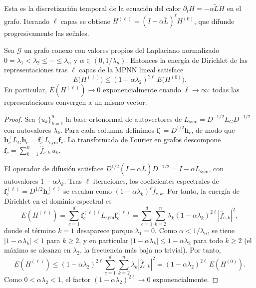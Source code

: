 Esta es la discretizaci\'on temporal de la ecuaci\'on del calor
$\partial_t H = -\alpha \tilde L H$ en el grafo. Iterando $\ell$ capas se obtiene
$H^{(\ell)} = (I - \alpha \tilde L)^\ell H^{(0)}$, que difunde progresivamente las
se\~nales.

\begin{theorem}
\label{thm:priors:oversmoothing}
Sea $\mathcal{G}$ un grafo conexo con valores propios del Laplaciano normalizado
$0 = \lambda_1 < \lambda_2 \le \cdots \le \lambda_n$ y
$\alpha \in (0, 1/\lambda_n)$. Entonces la energ\'ia de Dirichlet de las
representaciones tras $\ell$ capas de la MPNN lineal satisface
\[
  E\bigl(H^{(\ell)}\bigr) \le (1 - \alpha \lambda_2)^{2\ell}\, E\bigl(H^{(0)}\bigr).
\]
En particular, $E(H^{(\ell)}) \to 0$ exponencialmente cuando $\ell \to \infty$:
todas las representaciones convergen a un mismo vector.
\end{theorem}

\begin{proof}
Sea $\{u_k\}_{k=1}^{n}$ la base ortonormal de autovectores de
$L_{\mathrm{sym}} = D^{-1/2} L_G D^{-1/2}$ con autovalores $\lambda_k$. Para cada
columna definimos $\mathbf{f}_c = D^{1/2} \mathbf{h}_c$, de modo que
$\mathbf{h}_c^{\!\top} L_G \mathbf{h}_c = \mathbf{f}_c^{\!\top} L_{\mathrm{sym}}
\mathbf{f}_c$. La transformada de Fourier en grafos descompone
$\mathbf{f}_c = \sum_{k=1}^{n} \hat f_{c,k}\, u_k$.

El operador de difusi\'on satisface
$D^{1/2}(I - \alpha \tilde L) D^{-1/2} = I - \alpha L_{\mathrm{sym}}$, con
autovalores $1 - \alpha \lambda_k$. Tras $\ell$ iteraciones, los coeficientes
espectrales de $\mathbf{f}_c^{(\ell)} = D^{1/2} \mathbf{h}_c^{(\ell)}$ se escalan
como $(1 - \alpha \lambda_k)^\ell \hat f_{c,k}$. Por tanto, la energ\'ia de
Dirichlet en el dominio espectral es
\[
  E(H^{(\ell)})
    = \sum_{c=1}^{d} \mathbf{f}_c^{(\ell)\top} L_{\mathrm{sym}} \mathbf{f}_c^{(\ell)}
    = \sum_{c=1}^{d} \sum_{k=2}^{n} \lambda_k (1 - \alpha \lambda_k)^{2\ell}
      |\hat f_{c,k}|^2,
\]
donde el t\'ermino $k = 1$ desaparece porque $\lambda_1 = 0$. Como
$\alpha < 1/\lambda_n$, se tiene $|1 - \alpha \lambda_k| < 1$ para $k \ge 2$, y en
particular $|1 - \alpha \lambda_k| \le 1 - \alpha \lambda_2$ para todo $k \ge 2$
(el m\'aximo se alcanza en $\lambda_2$, la frecuencia m\'as baja no trivial). Por
tanto,
\[
  E(H^{(\ell)})
    \le (1 - \alpha \lambda_2)^{2\ell} \sum_{c=1}^{d} \sum_{k=2}^{n}
        \lambda_k |\hat f_{c,k}|^2
    = (1 - \alpha \lambda_2)^{2\ell}\, E(H^{(0)}).
\]
Como $0 < \alpha \lambda_2 < 1$, el factor $(1 - \alpha \lambda_2)^{2\ell} \to 0$
exponencialmente. \qedhere
\end{proof}

